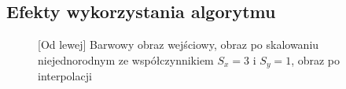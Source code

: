 \documentclass[a4paper,12pt, titlepage]{report}
\begin{document}
\subsection*{Efekty wykorzystania algorytmu}
\begin{figure}[h]
    \centering
    \caption{[Od lewej] Barwowy obraz wejściowy, obraz po skalowaniu niejednorodnym ze współczynnikiem \(S_{x}=3\) i  \(S_{y}=1\), obraz po interpolacji}%
    \label{fig:rysunek}%
\end{figure}
\FloatBarrier
\end{document}
